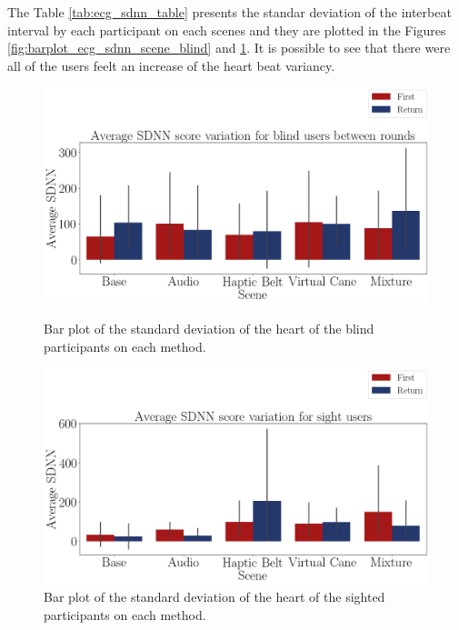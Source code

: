 The Table \ref{tab:ecg_sdnn_table} presents the standar deviation of the interbeat interval by each participant on each scenes and they are plotted in the Figures \ref{fig:barplot_ecg_sdnn_scene_blind} and \ref{fig:barplot_ecg_sdnn_scene_sight}. It is possible to see that there were all of the users feelt an increase of the heart beat variancy.



\begin{figure}[!htb]
    \centering
    \begin{minipage}{\textwidth}
        \centering
        \includegraphics[width = 0.8\linewidth]{Resultados/ECG/Figuras/png/barplot_ecg_sdnn_scene_blind.png}
        \caption{Bar plot of the standard deviation of the heart of the blind participants on each method.}
        \label{fig:barplot_ecg_sdnn_scene_blind}
    \end{minipage}
    \begin{minipage}{\textwidth}
        \centering
        \includegraphics[width = 0.8\linewidth]{Resultados/ECG/Figuras/png/barplot_ecg_sdnn_scene_sight.png}
        \caption{Bar plot of the standard deviation of the heart of the sighted participants on each method.}
        \label{fig:barplot_ecg_sdnn_scene_sight}
    \end{minipage}
\end{figure}

